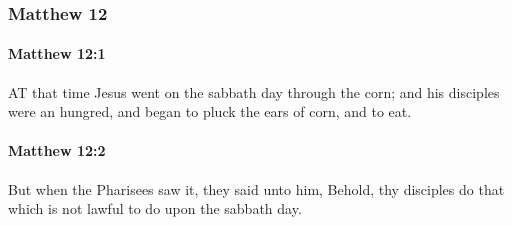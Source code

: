	\subsubsection{Matthew 12} %
		\label{MATTHEW-12}
		
		\paragraph{Matthew 12:1} %
			\label{MATTHEW-12-1}

			AT that time Jesus went on the sabbath day through the corn; and his disciples were an hungred, and began to pluck the ears of corn, and to eat.

			\begin{framed}
			\scriptsize
				\begin{compactdesc}
					\item[SBLG] 
				\end{compactdesc}
			\end{framed}

		\paragraph{Matthew 12:2} %
			\label{MATTHEW-12-2}

			But when the Pharisees saw it, they said unto him, Behold, thy disciples do that which is not lawful to do upon the sabbath day.

